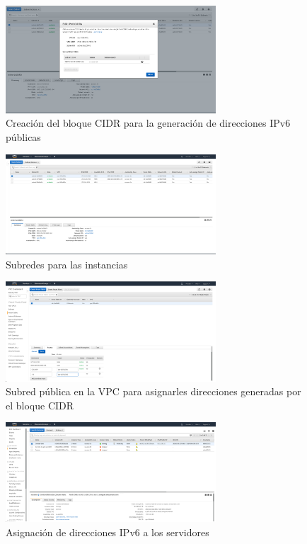 \documentclass[12pt]{article}
\begin{document}
\begin{figure}[H]
  \centering
  \includegraphics[width=0.7\textwidth]{ipv6_cidr}
  \caption{Creación del bloque CIDR para la generación de direcciones IPv6 públicas}
\end{figure}

\begin{figure}[H]
  \centering
  \includegraphics[width=0.7\textwidth]{subnets}
  \caption{Subredes para las instancias}
\end{figure}

\begin{figure}[H]
  \centering
  \includegraphics[width=0.7\textwidth]{public_subnet}
  \caption{Subred pública en la VPC para asignarles direcciones generadas por el bloque CIDR}
\end{figure}

\begin{figure}[H]
  \centering
  \includegraphics[width=0.7\textwidth]{ipv6_assignment}
  \caption{Asignación de direcciones IPv6 a los servidores}
\end{figure}
\end{document}

